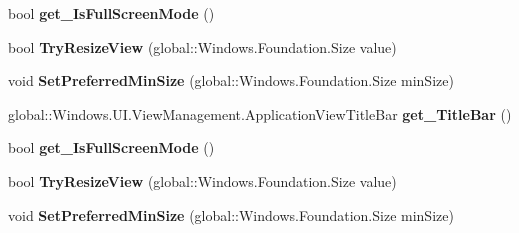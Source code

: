 \begin{DoxyCompactItemize}
\item 
\mbox{\label{interface_windows_1_1_u_i_1_1_view_management_1_1_i_application_view3_a9812a28b2f40c23228f4696cd1042fe8}} 
bool {\bfseries get\+\_\+\+Is\+Full\+Screen\+Mode} ()
\item 
\mbox{\label{interface_windows_1_1_u_i_1_1_view_management_1_1_i_application_view3_a20cf9528ed2169b0c836294dd5750097}} 
bool {\bfseries Try\+Resize\+View} (global\+::\+Windows.\+Foundation.\+Size value)
\item 
\mbox{\label{interface_windows_1_1_u_i_1_1_view_management_1_1_i_application_view3_abb301c42e193451baed06bd07c92fc46}} 
void {\bfseries Set\+Preferred\+Min\+Size} (global\+::\+Windows.\+Foundation.\+Size min\+Size)
\item 
\mbox{\label{interface_windows_1_1_u_i_1_1_view_management_1_1_i_application_view3_acc34a016b86b681c63d56374afcb3583}} 
global\+::\+Windows.\+U\+I.\+View\+Management.\+Application\+View\+Title\+Bar {\bfseries get\+\_\+\+Title\+Bar} ()
\item 
\mbox{\label{interface_windows_1_1_u_i_1_1_view_management_1_1_i_application_view3_a9812a28b2f40c23228f4696cd1042fe8}} 
bool {\bfseries get\+\_\+\+Is\+Full\+Screen\+Mode} ()
\item 
\mbox{\label{interface_windows_1_1_u_i_1_1_view_management_1_1_i_application_view3_a20cf9528ed2169b0c836294dd5750097}} 
bool {\bfseries Try\+Resize\+View} (global\+::\+Windows.\+Foundation.\+Size value)
\item 
\mbox{\label{interface_windows_1_1_u_i_1_1_view_management_1_1_i_application_view3_abb301c42e193451baed06bd07c92fc46}} 
void {\bfseries Set\+Preferred\+Min\+Size} (global\+::\+Windows.\+Foundation.\+Size min\+Size)
\item 

\end{DoxyCompactItemize}
